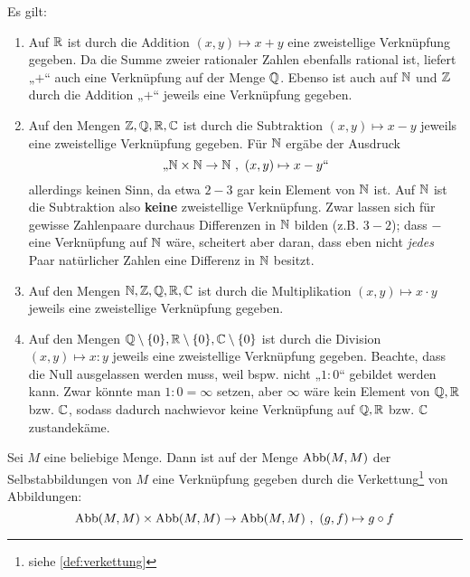 \begin{bsp}[Grundrechenarten]
    Es gilt:
    \begin{enumerate}
        \item Auf $\mathbb R$ ist durch die Addition $(x,y)\mapsto x+y$ eine zweistellige Verknüpfung gegeben. Da die Summe zweier rationaler Zahlen ebenfalls rational ist, liefert „$+$“ auch eine Verknüpfung auf der Menge $\mathbb Q$. Ebenso ist auch auf $\mathbb N$ und $\mathbb Z$ durch die Addition „$+$“ jeweils eine Verknüpfung gegeben.
        \item Auf den Mengen $\mathbb Z,\mathbb Q,\mathbb R,\mathbb C$ ist durch die Subtraktion $(x,y)\mapsto x-y$ jeweils eine zweistellige Verknüpfung gegeben. Für $\mathbb N$ ergäbe der Ausdruck
        \[ \text{„$\mathbb N \times \mathbb N \to \mathbb N \ ,\ (x,y) \mapsto x-y$“} \]
        allerdings keinen Sinn, da etwa $2-3$ gar kein Element von $\mathbb N$ ist. Auf $\mathbb N$ ist die Subtraktion also \textbf{keine} zweistellige Verknüpfung. Zwar lassen sich für gewisse Zahlenpaare durchaus Differenzen in $\mathbb N$ bilden (z.B. $3-2$); dass $-$ eine Verknüpfung auf $\mathbb N$ wäre, scheitert aber daran, dass eben nicht \emph{jedes} Paar natürlicher Zahlen eine Differenz in $\mathbb N$ besitzt.
        \item Auf den Mengen $\mathbb N,\mathbb Z,\mathbb Q,\mathbb R,\mathbb C$ ist durch die Multiplikation $(x,y)\mapsto x\cdot y$ jeweils eine zweistellige Verknüpfung gegeben.
        \item Auf den Mengen $\mathbb Q\setminus \{0\},\mathbb R\setminus \{0\},\mathbb C\setminus \{0\}$ ist durch die Division $(x,y)\mapsto x:y$ jeweils eine zweistellige Verknüpfung gegeben. Beachte, dass die Null ausgelassen werden muss, weil bspw. nicht „$1:0$“ gebildet werden kann. Zwar könnte man $1:0=\infty$ setzen, aber $\infty$ wäre kein Element von $\mathbb Q,\mathbb R$ bzw. $\mathbb C$, sodass dadurch nachwievor keine Verknüpfung auf $\mathbb Q,\mathbb R$ bzw. $\mathbb C$ zustandekäme.
    \end{enumerate}
\end{bsp}


\begin{bsp}
    Sei $M$ eine beliebige Menge. Dann ist auf der Menge $\operatorname{Abb}(M,M)$ der Selbstabbildungen von $M$ eine Verknüpfung gegeben durch die Verkettung\footnote{siehe \cref{def:verkettung}} von Abbildungen:
        \[ \operatorname{Abb}(M,M)\times \operatorname{Abb}(M,M)\to \operatorname{Abb}(M,M) \ ,\ (g,f)\mapsto g\circ f \]
\end{bsp}


